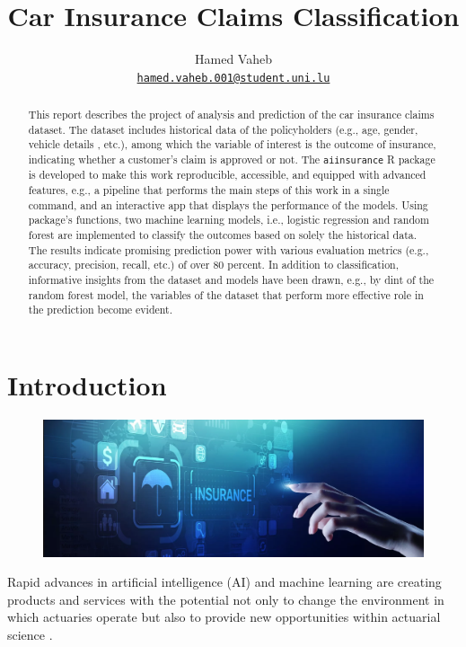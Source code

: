\documentclass{article}
\title{\color{astral}Car Insurance Claims Classification}
\author{
    Hamed Vaheb\\
  \texttt{\href{mailto:hamed.vaheb.001@student.uni.lu}{\nolinkurl{hamed.vaheb.001@student.uni.lu}}}%
  }
\begin{document}
\maketitle


\begin{abstract}
This report describes the project of analysis and prediction of the car
insurance claims dataset. The dataset includes historical data of the
policyholders (e.g., age, gender, vehicle details , etc.), among which
the variable of interest is the outcome of insurance, indicating whether
a customer's claim is approved or not. The \texttt{aiinsurance} R
package \cite{package} is developed to make this work reproducible,
accessible, and equipped with advanced features, e.g., a pipeline that
performs the main steps of this work in a single command, and an
interactive app that displays the performance of the models. Using
package's functions, two machine learning models, i.e., logistic
regression and random forest are implemented to classify the outcomes
based on solely the historical data. The results indicate promising
prediction power with various evaluation metrics (e.g., accuracy,
precision, recall, etc.) of over 80 percent. In addition to
classification, informative insights from the dataset and models have
been drawn, e.g., by dint of the random forest model, the variables of
the dataset that perform more effective role in the prediction become
evident.
\end{abstract}


\hypertarget{introduction}{%
\section{Introduction}\label{introduction}}

\begin{figure}
\includegraphics[width=0.9\linewidth]{./figures/aiactuary.png}
\end{figure}

Rapid advances in artificial intelligence (AI) and machine learning are
creating products and services with the potential not only to change the
environment in which actuaries operate but also to provide new
opportunities within actuarial science \cite{aiinins}.
\end{document}
